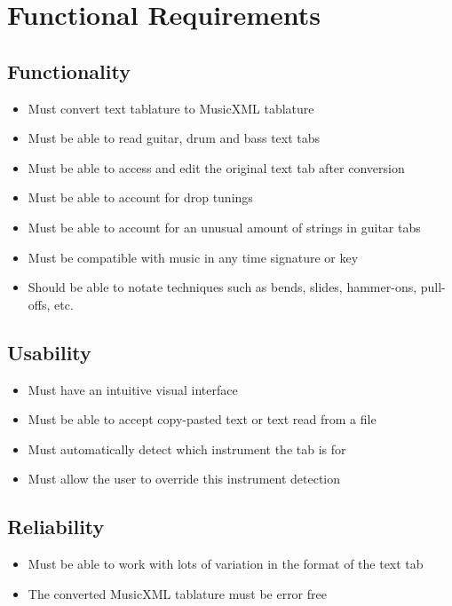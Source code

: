 \documentclass[11pt]{article}
\date{\today}
\title{}
\begin{document}
\tableofcontents

\section{Functional Requirements}
\label{sec:org14dc261}
\subsection{Functionality}
\label{sec:orgc561520}
\begin{itemize}
\item Must convert text tablature to MusicXML tablature
\item Must be able to read guitar, drum and bass text tabs
\item Must be able to access and edit the original text tab after conversion
\item Must be able to account for drop tunings
\item Must be able to account for an unusual amount of strings in guitar tabs
\item Must be compatible with music in any time signature or key
\item Should be able to notate techniques such as bends, slides, hammer-ons, pull-offs, etc.
\end{itemize}

\subsection{Usability}
\label{sec:orge7b56c5}
\begin{itemize}
\item Must have an intuitive visual interface
\item Must be able to accept copy-pasted text or text read from a file
\item Must automatically detect which instrument the tab is for
\item Must allow the user to override this instrument detection
\end{itemize}

\subsection{Reliability}
\label{sec:org86adf94}
\begin{itemize}
\item Must be able to work with lots of variation in the format of the text tab
\item The converted MusicXML tablature must be error free
\end{itemize}
\end{document}
